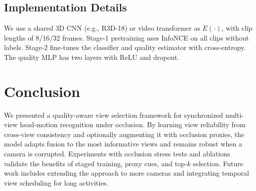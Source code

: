 \documentclass[runningheads]{llncs}
\begin{document}
\subsection{Implementation Details}
We use a shared 3D CNN (e.g., R3D-18) or video transformer as $E(\cdot)$, with clip lengths of 8/16/32 frames. Stage-1 pretraining uses InfoNCE on all clips without labels. Stage-2 fine-tunes the classifier and quality estimator with cross-entropy. The quality MLP has two layers with ReLU and dropout.

\section{Conclusion}
We presented a quality-aware view selection framework for synchronized multi-view head-motion recognition under occlusion. By learning view reliability from cross-view consistency and optionally augmenting it with occlusion proxies, the model adapts fusion to the most informative views and remains robust when a camera is corrupted. Experiments with occlusion stress tests and ablations validate the benefits of staged training, proxy cues, and top-$k$ selection. Future work includes extending the approach to more cameras and integrating temporal view scheduling for long activities.






\end{document}
